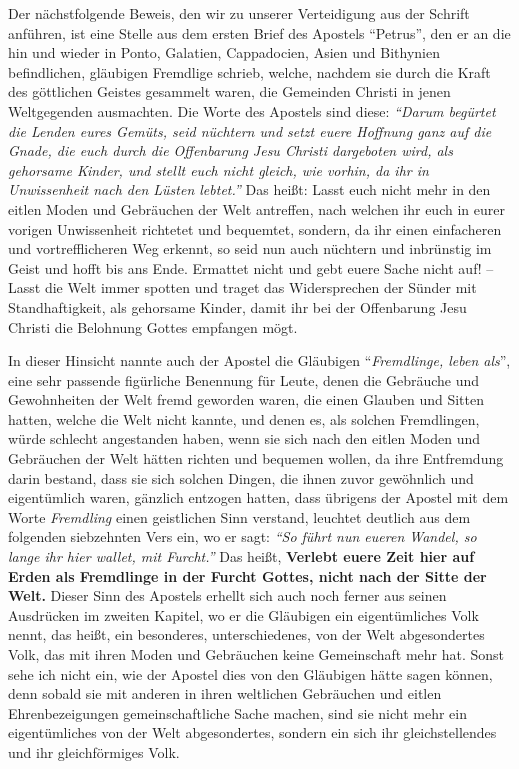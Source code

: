 Der nächstfolgende Beweis, den wir zu unserer Verteidigung aus der Schrift
anführen, ist eine Stelle aus dem ersten Brief des Apostels "`Petrus"', den er
an die hin und wieder in Ponto, Galatien, Cappadocien, Asien und
Bithynien befindlichen, gläubigen Fremdlige schrieb, welche, nachdem sie
durch die Kraft des göttlichen Geistes gesammelt waren, die Gemeinden Christi
in jenen Weltgegenden ausmachten. Die Worte des Apostels sind diese:
\textit{"`Darum
begürtet die Lenden eures Gemüts, seid nüchtern und setzt euere Hoffnung ganz
auf die Gnade, die euch durch die Offenbarung Jesu Christi dargeboten wird,
als gehorsame Kinder, und stellt euch nicht gleich, wie vorhin, da ihr in
Unwissenheit nach den Lüsten lebtet."'}
Das heißt:
Lasst euch nicht mehr in den eitlen Moden und Gebräuchen der Welt antreffen,
nach
welchen ihr euch in eurer vorigen Unwissenheit richtetet und bequemtet, sondern,
da ihr einen einfacheren und vortrefflicheren Weg erkennt, so seid nun auch
nüchtern und inbrünstig im Geist und hofft bis ans Ende. Ermattet nicht und
gebt euere Sache nicht auf! -- Lasst die Welt immer spotten und traget das
Widersprechen der Sünder mit Standhaftigkeit, als gehorsame Kinder, damit ihr
bei der Offenbarung Jesu Christi die Belohnung Gottes empfangen mögt.

\medskip


In dieser Hinsicht nannte auch der Apostel die Gläubigen "`\textit{Fremdlinge,
leben als}"', eine sehr
passende figürliche Benennung für Leute, denen die Gebräuche und Gewohnheiten
der Welt fremd geworden waren, die einen Glauben und Sitten hatten, welche die
Welt nicht kannte, und denen es, als solchen Fremdlingen, würde schlecht
angestanden haben, wenn sie sich nach den eitlen Moden und Gebräuchen der Welt
hätten richten und bequemen wollen, da ihre Entfremdung darin bestand, dass sie
sich solchen Dingen, die ihnen zuvor gewöhnlich und eigentümlich waren,
gänzlich entzogen hatten, dass übrigens der Apostel mit dem Worte
\textit{Fremdling}
einen geistlichen Sinn verstand, leuchtet deutlich aus dem folgenden siebzehnten
Vers ein, wo er sagt:
\textit{"`So führt nun eueren Wandel, so lange ihr hier wallet,
mit Furcht."'}
Das heißt, \textbf{Verlebt euere Zeit hier auf Erden als Fremdlinge in der
Furcht Gottes, nicht nach der Sitte der Welt.} Dieser Sinn des Apostels erhellt
sich
auch noch ferner aus seinen Ausdrücken im zweiten Kapitel, wo er die Gläubigen
ein eigentümliches Volk nennt, das heißt, ein besonderes, unterschiedenes, von
der
Welt abgesondertes Volk, das mit ihren Moden und Gebräuchen keine Gemeinschaft
mehr hat. Sonst sehe ich nicht ein, wie der Apostel dies von den Gläubigen
hätte sagen können, denn sobald sie mit anderen in ihren weltlichen Gebräuchen
und eitlen Ehrenbezeigungen gemeinschaftliche Sache machen, sind sie nicht mehr
ein eigentümliches von der Welt abgesondertes, sondern ein sich ihr
gleichstellendes und ihr gleichförmiges Volk.


